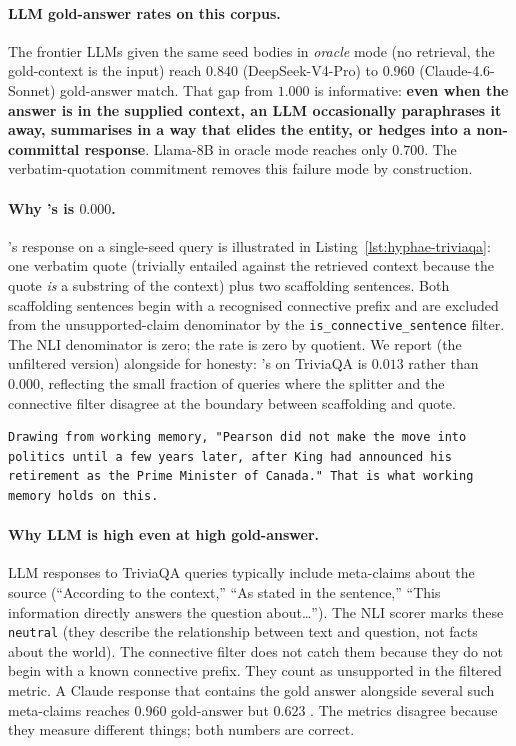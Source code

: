 \paragraph{LLM gold-answer rates on this corpus.}
The frontier LLMs given the same seed bodies in \emph{oracle} mode
(no retrieval, the gold-context is the input) reach $0.840$
(DeepSeek-V4-Pro) to $0.960$ (Claude-4.6-Sonnet) gold-answer
match. That gap from $1.000$ is informative: \textbf{even when the
answer is in the supplied context, an LLM occasionally paraphrases
it away, summarises in a way that elides the entity, or hedges into
a non-committal response}. Llama-8B in oracle mode reaches only
$0.700$. The verbatim-quotation commitment removes this failure
mode by construction.

\paragraph{Why \hyphae{}'s \unsupf{} is $0.000$.}
\hyphae{}'s response on a single-seed query is illustrated in
Listing~\ref{lst:hyphae-triviaqa}: one verbatim quote (trivially
entailed against the retrieved context because the quote \emph{is}
a substring of the context) plus two scaffolding sentences. Both
scaffolding sentences begin with a recognised connective prefix
and are excluded from the unsupported-claim denominator by the
\texttt{is\_connective\_sentence} filter. The NLI denominator is
zero; the rate is zero by quotient. We report \unsupr{} (the
unfiltered version) alongside \unsupf{} for honesty: \hyphae{}'s
\unsupr{} on TriviaQA is $0.013$ rather than $0.000$, reflecting
the small fraction of queries where the splitter and the connective
filter disagree at the boundary between scaffolding and quote.

\begin{lstlisting}[caption={\hyphae{} response on TriviaQA query
\texttt{triviaqa-qb\_4397}.}, label={lst:hyphae-triviaqa}]
Drawing from working memory, "Pearson did not make the move into
politics until a few years later, after King had announced his
retirement as the Prime Minister of Canada." That is what working
memory holds on this.
\end{lstlisting}

\paragraph{Why LLM \unsupf{} is high even at high gold-answer.}
LLM responses to TriviaQA queries typically include meta-claims
about the source (``According to the context,'' ``As stated in
the sentence,'' ``This information directly answers the question
about\ldots''). The NLI scorer marks these \texttt{neutral} (they
describe the relationship between text and question, not facts
about the world). The connective filter does not catch them
because they do not begin with a known connective prefix. They
count as unsupported in the filtered metric. A Claude response
that contains the gold answer alongside several such meta-claims
reaches $0.960$ gold-answer but $0.623$ \unsupf. The metrics
disagree because they measure different things; both numbers are
correct.

